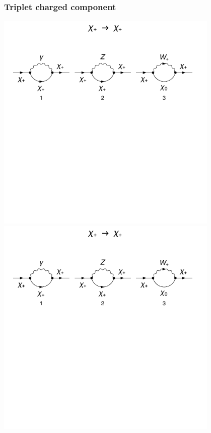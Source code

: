\documentclass[11pt]{article}
\begin{document}
\subsubsection{Triplet charged component}

\noindent\begin{minipage}{0.3\textwidth}
\includegraphics[width=0.8\textwidth]{F1_1_a.pdf}\\
\includegraphics[width=0.8\textwidth]{F1_1_b.pdf}\\

\end{minipage}
\end{document}
